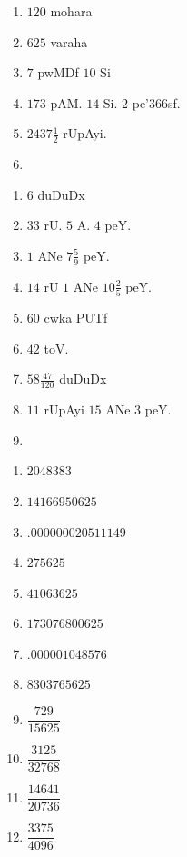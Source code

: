 
\begin{multicols}{3}
\begin{enumerate}[$(1)$]
\item $120$ mohara
\item $625$ varaha
\item $7$ pwMDf $10$ Si
\item $173$ pAM. $14$ Si. $2$ pe\char'366sf.
\item $2437\frac{1}{2}$ rUpAyi.
\item[]
\end{enumerate}
\end{multicols}


\begin{multicols}{3}
\begin{enumerate}[$(1)$]
\item $6$ duDuDx
\item $33$ rU. $5$ A. $4$ peY.
\item $1$ ANe $7 \frac{5}{9}$ peY.
\item $14$ rU $1$ ANe $10 \frac{2}{5}$ peY.
\item $60$ cwka PUTf 
\item $42$ toV.
\item $58\frac{47}{120}$ duDuDx
\item $11$ rUpAyi $15$ ANe $3$ peY. 
\item[]
\end{enumerate}
\end{multicols}


\begin{multicols}{3}
\begin{enumerate}[$(1)$]
\item $2048383$
\item $14166950625$
\item $.000000020511149$
\item $275625$
\item $41063625$
\item $173076800625$
\item $.000001048576$
\item $8303765625$
\item $\dfrac{729}{15625}$
\item $\dfrac{3125}{32768}$
\item $\dfrac{14641}{20736}$
\item $\dfrac{3375}{4096}$
\end{enumerate}
\end{multicols}

